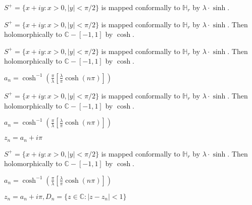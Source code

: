 \documentclass{beamer}
\begin{document}
\begin{frame} 

$S^+ = \{ x + iy : x > 0, |y| < \pi/2 \}$ is mapped conformally to $\mathbb{H}_r$ by $\lambda\cdot\sinh$.  

\end{frame}



\begin{frame} 

$S^+ = \{ x + iy : x > 0, |y| < \pi/2 \}$ is mapped conformally to $\mathbb{H}_r$ by $\lambda\cdot\sinh$. Then holomorphically to $\mathbb{C} - [-1,1]$ by $\cosh$.

\end{frame}




\begin{frame} 

$S^+ = \{ x + iy : x > 0, |y| < \pi/2 \}$ is mapped conformally to $\mathbb{H}_r$ by $\lambda\cdot\sinh$. Then holomorphically to $\mathbb{C} - [-1,1]$ by $\cosh$.

\vspace{2.5mm}

$a_n = \cosh^{-1}\left( \frac{\pi}{\lambda} \left[ \frac{\lambda}{\pi} \cosh(n\pi) \right] \right)$

\end{frame}





\begin{frame} 

$S^+ = \{ x + iy : x > 0, |y| < \pi/2 \}$ is mapped conformally to $\mathbb{H}_r$ by $\lambda\cdot\sinh$. Then holomorphically to $\mathbb{C} - [-1,1]$ by $\cosh$.

\vspace{2.5mm}

$a_n = \cosh^{-1}\left( \frac{\pi}{\lambda} \left[ \frac{\lambda}{\pi} \cosh(n\pi) \right] \right)$

\vspace{2.5mm}

$z_n = a_n + i\pi$

\end{frame}




\begin{frame} 

$S^+ = \{ x + iy : x > 0, |y| < \pi/2 \}$ is mapped conformally to $\mathbb{H}_r$ by $\lambda\cdot\sinh$. Then holomorphically to $\mathbb{C} - [-1,1]$ by $\cosh$.

\vspace{2.5mm}

$a_n = \cosh^{-1}\left( \frac{\pi}{\lambda} \left[ \frac{\lambda}{\pi} \cosh(n\pi) \right] \right)$

\vspace{2.5mm}

$z_n = a_n + i\pi, D_n = \{ z \in \mathbb{C} : \left| z - z_n \right| < 1\} $

\end{frame}
\end{document}

